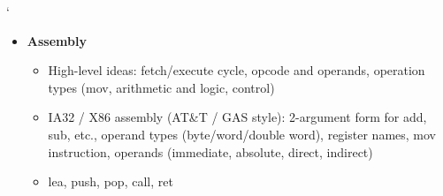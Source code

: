`\documentclass[answers,12pt,addpoints]{exam}
\begin{document}
\begin{multicols}{2}
\begin{itemize}
        \item \textbf{Assembly}
        \begin{itemize}
            \item High-level ideas: fetch/execute cycle, opcode and operands, operation types (mov, arithmetic and logic, control)
            \item IA32 / X86 assembly (AT\&T / GAS style): 2-argument form for add, sub, etc., operand types (byte/word/double word), register names, mov instruction, operands (immediate, absolute, direct, indirect)
            \item lea, push, pop, call, ret
        \end{itemize}
    \end{itemize}
\setlength{\baselineskip}{12pt}
\end{multicols}
\end{document}

